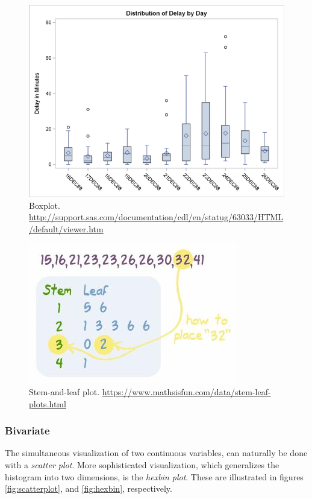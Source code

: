 \begin{figure}[h]
\centering
\includegraphics[height=0.3\textheight]{art/ex6aout}
\caption[BoxPlot]{Boxplot. \newline \url{http://support.sas.com/documentation/cdl/en/statug/63033/HTML/default/viewer.htm}}
\label{fig:boxplot}
\end{figure}



\begin{figure}[h]
\centering
\includegraphics[height=0.3\textheight]{art/stem_and_leaf}
\caption[Stem and Leaf Pot]{Stem-and-leaf plot. \newline
\url{https://www.mathsisfun.com/data/stem-leaf-plots.html}}
\label{fig:stem_and_leaf}
\end{figure}




\subsubsection{Bivariate}
The simultaneous visualization of two continuous variables, can naturally be done with a \emph{scatter plot}.
More sophisticated visualization, which generalizes the histogram into two dimensions, is the \emph{hexbin plot}.  
These are illustrated in figures \ref{fig:scatterplot}, and \ref{fig:hexbin}, respectively. 


